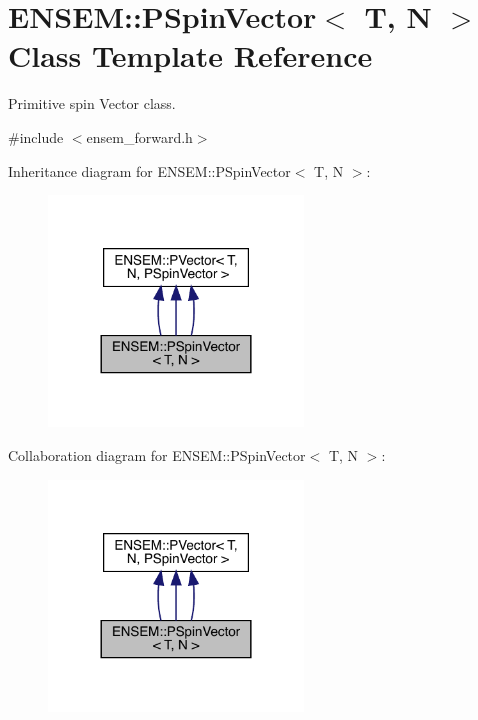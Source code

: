 \hypertarget{classENSEM_1_1PSpinVector}{}\section{E\+N\+S\+EM\+:\+:P\+Spin\+Vector$<$ T, N $>$ Class Template Reference}
\label{classENSEM_1_1PSpinVector}


Primitive spin Vector class.  




{\ttfamily \#include $<$ensem\+\_\+forward.\+h$>$}



Inheritance diagram for E\+N\+S\+EM\+:\+:P\+Spin\+Vector$<$ T, N $>$\+:
\nopagebreak
\begin{figure}[H]
\begin{center}
\leavevmode
\includegraphics[width=192pt]{d1/dec/classENSEM_1_1PSpinVector__inherit__graph}
\end{center}
\end{figure}


Collaboration diagram for E\+N\+S\+EM\+:\+:P\+Spin\+Vector$<$ T, N $>$\+:
\nopagebreak
\begin{figure}[H]
\begin{center}
\leavevmode
\includegraphics[width=192pt]{db/da2/classENSEM_1_1PSpinVector__coll__graph}
\end{center}
\end{figure}
